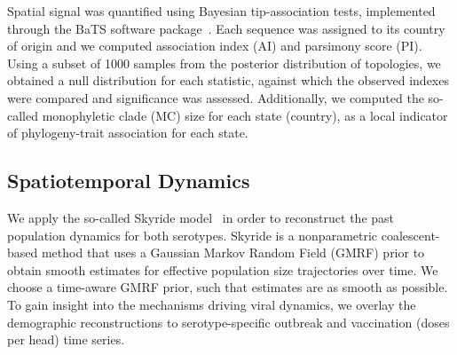 \documentclass[10pt]{article}
\begin{document}
Spatial signal was quantified using Bayesian tip-association tests, implemented through the BaTS software package~\cite{bats}.
Each sequence was assigned to its country of origin and we computed association index (AI) and parsimony score (PI).
Using a subset of 1000 samples from the posterior distribution of topologies, we obtained a null distribution for each statistic, against which the observed indexes were compared and significance was assessed.
Additionally, we computed the so-called monophyletic clade (MC) size for each state (country), as a local indicator of phylogeny-trait association for each state.


\subsection*{Spatiotemporal Dynamics}

We apply the so-called Skyride model~\cite{skyride} in order to reconstruct the past population dynamics for both serotypes. Skyride is a nonparametric coalescent-based method that uses a Gaussian Markov Random Field (GMRF) prior to obtain smooth estimates for effective population size trajectories over time. We choose a time-aware GMRF prior, such that estimates are as smooth as possible.
To gain insight into the mechanisms driving viral dynamics, we overlay the demographic reconstructions to serotype-specific outbreak and vaccination (doses per head) time series.
\end{document}
